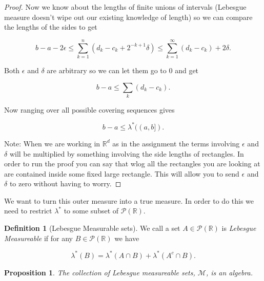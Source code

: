 \documentclass[
]{book}
\newtheorem{proposition}{Proposition}[chapter]
\theoremstyle{definition}
\newtheorem{definition}{Definition}[chapter]
\theoremstyle{definition}
\theoremstyle{definition}
\theoremstyle{definition}
\theoremstyle{remark}
\begin{document}
\begin{proof}
Now we know about the lengths of finite unions of intervals (Lebesgue measure doesn't wipe out our existing knowledge of length) so we can compare the lengths of the sides to get

\[ b-a - 2\epsilon \leq \sum_{k=1}^n (d_k - c_k + 2^{-k+1} \delta) \leq \sum_{k=1}^\infty (d_k-c_k) + 2 \delta. \]

Both \(\epsilon\) and \(\delta\) are arbitrary so we can let them go to \(0\) and get

\[ b-a \leq \sum_k (d_k - c_k). \]

Now ranging over all possible covering sequences gives

\[ b-a \leq \lambda^*((a,b]). \]

Note: When we are working in \(\mathbb{R}^d\) as in the assignment the terms involving \(\epsilon\) and \(\delta\) will be multiplied by something involving the side lengths of rectangles. In order to run the proof you can say that wlog all the rectangles you are looking at are contained inside some fixed large rectangle. This will allow you to send \(\epsilon\) and \(\delta\) to zero without having to worry.
\end{proof}

We want to turn this outer measure into a true measure. In order to do this we need to restrict \(\lambda^*\) to some subset of \(\mathscr{P}(\mathbb{R})\).

\begin{definition}[Lebesgue Measurable sets]
We call a set \(A \in \mathscr{P}(\mathbb{R})\) is \emph{Lebesgue Measureable} if for any \(B \in \mathscr{P}(\mathbb{R})\) we have

\[ \lambda^*(B) = \lambda^*(A \cap B) + \lambda^*(A^c \cap B). \]
\end{definition}

\begin{proposition}
The collection of Lebesgue measureable sets, \(\mathscr{M}\), is an algebra.
\end{proposition}
\end{document}
